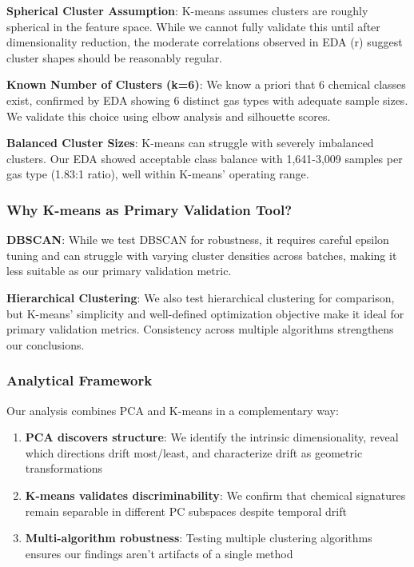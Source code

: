 \documentclass[
  letterpaper,
  DIV=11,
  numbers=noendperiod]{scrartcl}
\providecommand{\tightlist}{%
  \setlength{\itemsep}{0pt}\setlength{\parskip}{0pt}}
\begin{document}
\textbf{Spherical Cluster Assumption}: K-means assumes clusters are
roughly spherical in the feature space. While we cannot fully validate
this until after dimensionality reduction, the moderate correlations
observed in EDA (\textbar r) suggest cluster shapes should
be reasonably regular.

\textbf{Known Number of Clusters (k=6)}: We know a priori that 6
chemical classes exist, confirmed by EDA showing 6 distinct gas types
with adequate sample sizes. We validate this choice using elbow analysis
and silhouette scores.

\textbf{Balanced Cluster Sizes}: K-means can struggle with severely
imbalanced clusters. Our EDA showed acceptable class balance with
1,641-3,009 samples per gas type (1.83:1 ratio), well within K-means'
operating range.

\subsubsection{Why K-means as Primary Validation
Tool?}\label{why-k-means-as-primary-validation-tool}

\textbf{DBSCAN}: While we test DBSCAN for robustness, it requires
careful epsilon tuning and can struggle with varying cluster densities
across batches, making it less suitable as our primary validation
metric.

\textbf{Hierarchical Clustering}: We also test hierarchical clustering
for comparison, but K-means' simplicity and well-defined optimization
objective make it ideal for primary validation metrics. Consistency
across multiple algorithms strengthens our conclusions.

\subsubsection{Analytical Framework}\label{analytical-framework}

Our analysis combines PCA and K-means in a complementary way:

\begin{enumerate}
\def\labelenumi{\arabic{enumi}.}
\tightlist
\item
  \textbf{PCA discovers structure}: We identify the intrinsic
  dimensionality, reveal which directions drift most/least, and
  characterize drift as geometric transformations
\item
  \textbf{K-means validates discriminability}: We confirm that chemical
  signatures remain separable in different PC subspaces despite temporal
  drift
\item
  \textbf{Multi-algorithm robustness}: Testing multiple clustering
  algorithms ensures our findings aren't artifacts of a single method
\end{enumerate}
\end{document}

